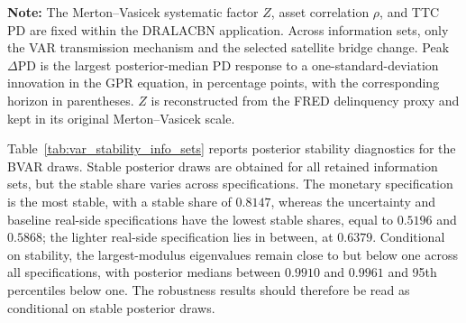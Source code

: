 \begin{table}[!htbp]
  \centering
  \scriptsize
  \tablestretch
  \compacttablecols
  \setlength{\tabcolsep}{6pt}
  \caption{\textbf{DRALACBN credit-risk responses across VAR information sets.}}
  \label{tab:dralacbn_information_set_robustness}
  \begin{minipage}{0.92\textwidth}
  \centering
  \medskip
  \footnotesize
  \justifying
  \noindent \textbf{Note:} The Merton--Vasicek systematic factor $Z$, asset
  correlation $\rho$, and TTC PD are fixed within the DRALACBN application.
  Across information sets, only the VAR transmission mechanism and the
  selected satellite bridge change. Peak $\Delta$PD is the largest
  posterior-median PD response to a one-standard-deviation innovation in the
  GPR equation, in percentage points, with the corresponding horizon in
  parentheses. $Z$ is reconstructed from the FRED delinquency proxy and kept
  in its original Merton--Vasicek scale.
  \end{minipage}
\end{table}
Table~\ref{tab:var_stability_info_sets} reports posterior stability
diagnostics for the BVAR draws. Stable posterior draws are obtained for all
retained information sets, but the stable share varies across specifications.
The monetary specification is the most stable, with a stable share of
$0.8147$, whereas the uncertainty and baseline real-side specifications have
the lowest stable shares, equal to $0.5196$ and $0.5868$; the lighter
real-side specification lies in between, at $0.6379$. Conditional on
stability, the largest-modulus eigenvalues remain close to but below one
across all specifications, with posterior medians between $0.9910$ and
$0.9961$ and 95th percentiles below one. The robustness results should
therefore be read as conditional on stable posterior draws.
